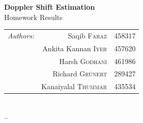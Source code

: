 \documentclass[12pt]{article}
\begin{document}
\begin{titlepage}

{ \huge \bfseries Doppler Shift Estimation}\\ %
\vspace{0.034441853748633004\paperheight}
\large Homework Results\\
\vspace{0.1458980337503154\paperheight}


  \begin{tabular}{lrr}
    \emph{Authors:} & Saqib {\color{blue-6}\textsc{Faraz}} & {\color{mat-gray}458317}\\
                    & Ankita Kannan {\color{blue-6}\textsc{Iyer}} & {\color{mat-gray}457620}\\
                    & Harsh {\color{blue-6}\textsc{Godhani}} & {\color{mat-gray}461986}\\
                    & Richard {\color{blue-6}\textsc{Grünert}} & {\color{mat-gray}289427}\\
                    & Kanaiyalal {\color{blue-6}\textsc{Thummar}} & {\color{mat-gray}435534}\\

   \end{tabular}\\[0.05572809000084118\paperheight]

{\large {\the\day.\the\month.\the\year}}\\




\vfill %

\end{titlepage}
\end{document}
